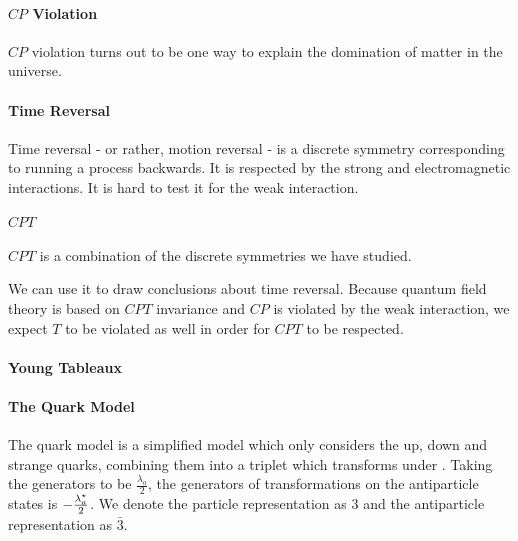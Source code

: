 \paragraph{$CP$ Violation}
$CP$ violation turns out to be one way to explain the domination of matter in the universe.

\paragraph{Time Reversal}
Time reversal - or rather, motion reversal - is a discrete symmetry corresponding to running a process backwards. It is respected by the strong and electromagnetic interactions. It is hard to test it for the weak interaction.

\paragraph{$CPT$}
$CPT$ is a combination of the discrete symmetries we have studied.

We can use it to draw conclusions about time reversal. Because quantum field theory is based on $CPT$ invariance and $CP$ is violated by the weak interaction, we expect $T$ to be violated as well in order for $CPT$ to be respected.

\paragraph{Young Tableaux}

\paragraph{The Quark Model}
The quark model is a simplified model which only considers the up, down and strange quarks, combining them into a triplet which transforms under . Taking the generators to be $\frac{\lambda_{a}}{2}$, the generators of transformations on the antiparticle states is $-\frac{\lambda_{a}^{\star}}{2}$. We denote the particle representation as $3$ and the antiparticle representation as $\bar{3}$.
